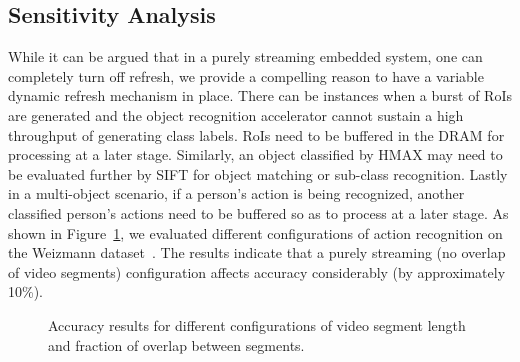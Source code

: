 \subsection{Sensitivity Analysis}
While it can be argued that in a purely streaming embedded system, one can completely turn off refresh, we provide a compelling reason to have a variable dynamic refresh mechanism in place. There can be instances when a burst of RoIs are generated and the object recognition accelerator cannot sustain a high throughput of generating class labels. RoIs need to be buffered in the DRAM for processing at a later stage. Similarly, an object classified by HMAX may need to be evaluated further by SIFT for object matching or sub-class recognition. Lastly in a multi-object scenario, if a person's action is being recognized, another classified person's actions need to be buffered so as to process at a later stage. As shown in Figure~\ref{fig:ActionRecognition}, we evaluated different configurations of action recognition on the Weizmann dataset~\cite{Weizmann}. The results indicate that a purely streaming (no overlap of video segments) configuration affects accuracy considerably (by approximately 10\%).  

\begin{figure}[ht!]
\centering
{}
\caption{\label{fig:ActionRecognition} Accuracy results for different configurations of video segment length and fraction of overlap between segments.}
\vspace{-0.2in}
\end{figure}


